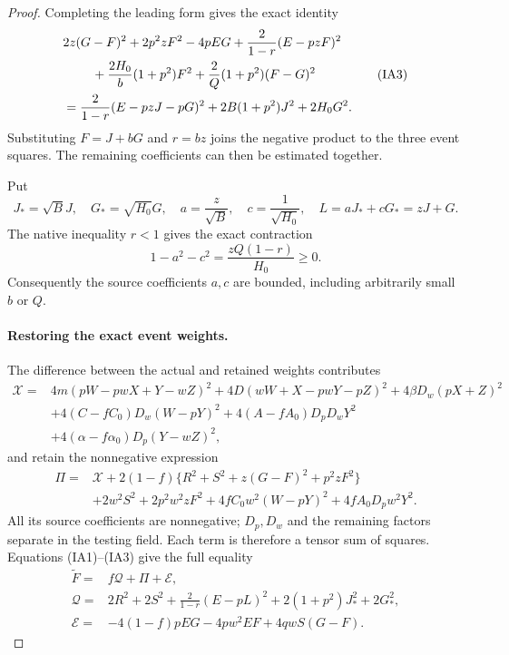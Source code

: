 \begin{proof}
Completing the leading form gives the exact identity
\[
\begin{split}
 &2z(G-F)^2+2p^2zF^2-4pEG
 +\frac2{1-r}(E-pzF)^2\\
 &\hspace{8mm}+\frac{2H_0}{b}(1+p^2)F^2
                    +\frac2Q(1+p^2)(F-G)^2\\
 &=\frac2{1-r}(E-pzJ-pG)^2
                  +2B(1+p^2)J^2+2H_0G^2.
\end{split}                                                    \tag{IA3}
\]
Substituting $F=J+bG$ and $r=bz$ joins the negative product to
the three event squares. The remaining coefficients can then be
estimated together.

Put
\[
 J_* =\sqrt B J,\quad G_* =\sqrt{H_0}G,\quad
 a=\frac z{\sqrt B},\quad c=\frac1{\sqrt{H_0}},\quad
 L=aJ_*+cG_*=zJ+G.
\]
The native inequality $r<1$ gives the exact contraction
\[
 1-a^2-c^2=\frac{zQ(1-r)}{H_0}\ge0.                  \tag{IA4}
\]
Consequently the source coefficients $a,c$ are bounded, including
arbitrarily small $b$ or $Q$.

\paragraph{Restoring the exact event weights.}
The difference between the actual and retained weights contributes
\[
\begin{split}
 \mathcal X={}&4m(pW-pwX+Y-wZ)^2
       +4D(wW+X-pwY-pZ)^2+4\beta D_w(pX+Z)^2\\
 &+4(C-fC_0)D_w(W-pY)^2
       +4(A-fA_0)D_pD_wY^2\\
 &+4(\alpha-f\alpha_0)D_p(Y-wZ)^2,
\end{split}
\]
and retain the nonnegative expression
\[
\begin{split}
 \Pi={}&\mathcal X
 +2(1-f)\{R^2+S^2+z(G-F)^2+p^2zF^2\}\\
 &+2w^2S^2+2p^2w^2zF^2
 +4fC_0w^2(W-pY)^2+4fA_0D_pw^2Y^2.
\end{split}                                                    \tag{IA5}
\]
All its source coefficients are nonnegative; $D_p,D_w$ and the
remaining factors separate in the testing field. Each term is
therefore a tensor sum of squares. Equations (IA1)--(IA3) give
the full equality
\[
\begin{split}
 \widetilde F={}&f\mathcal Q+\Pi+\mathcal E,\\
 \mathcal Q={}&2R^2+2S^2+\frac2{1-r}(E-pL)^2
                         +2(1+p^2)J_*^2+2G_*^2,\\
 \mathcal E={}&-4(1-f)pEG-4pw^2EF+4qwS(G-F).
\end{split}                                                    \tag{IA6}
\]


\end{proof}
